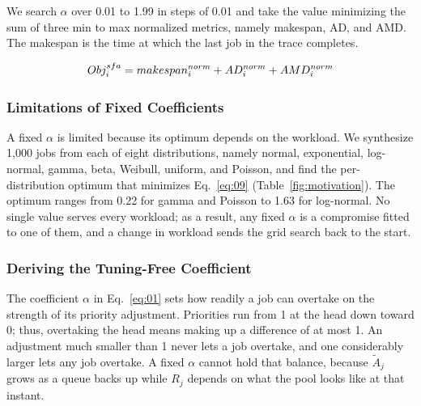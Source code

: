 \documentclass{ieeetj}
\begin{document}
We search $\alpha$ over 0.01 to 1.99 in steps of 0.01 and take the value minimizing the sum of three min to max normalized metrics, namely makespan, AD, and AMD. The makespan is the time at which the last job in the trace completes. 

\begin{equation}
Obj_i^{sfa} = makespan_i^{norm} + AD_i^{norm} + AMD_i^{norm}
\label{eq:09}
\vspace{2pt}
\end{equation}

\subsubsection{Limitations of Fixed Coefficients}\label{coeff:limit}
A fixed $\alpha$ is limited because its optimum depends on the workload. We synthesize 1,000 jobs from each of eight distributions, namely normal, exponential, log-normal, gamma, beta, Weibull, uniform, and Poisson, and find the per-distribution optimum that minimizes Eq.~\eqref{eq:09} (Table~\ref{fig:motivation}). The optimum ranges from 0.22 for gamma and Poisson to 1.63 for log-normal. No single value serves every workload; as a result, any fixed $\alpha$ is a compromise fitted to one of them, and a change in workload sends the grid search back to the start.

\begin{table}[htb!]
\centering
\caption{Optimal $\alpha$ by distribution}
\label{fig:motivation}
\footnotesize
\setlength{\tabcolsep}{4pt}
\end{table}

\subsubsection{Deriving the Tuning-Free Coefficient} \label{alphaeff}
The coefficient $\alpha$ in Eq.~\eqref{eq:01} sets how readily a job can overtake on the strength of its priority adjustment. Priorities run from 1 at the head down toward 0; thus, overtaking the head means making up a difference of at most 1. An adjustment much smaller than 1 never lets a job overtake, and one considerably larger lets any job overtake. A fixed $\alpha$ cannot hold that balance, because $\tilde A_j$ grows as a queue backs up while $R_j$ depends on what the pool looks like at that instant.
\end{document}
